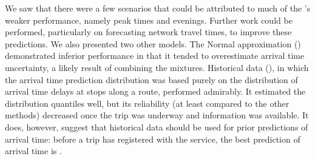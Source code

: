 We saw that there were a few scenarios that could be attributed to much of the \pf{}'s weaker performance, namely peak times and evenings. Further work could be performed, particularly on forecasting network travel times, to improve these predictions. We also presented two other models. The Normal approximation (\Fnorm{}) demonstrated inferior performance in that it tended to overestimate arrival time uncertainty, a likely result of combining the mixtures. Historical data (\Fhist{}), in which the arrival time prediction distribution was based purely on the distribution of arrival time delays at stops along a route, performed admirably. It estimated the distribution quantiles well, but its reliability (at least compared to the other methods) decreased once the trip was underway and \rt{} information was available. It does, however, suggest that historical data should be used for prior predictions of arrival time: before a trip has registered with the \rt{} service, the best prediction of arrival time is \Fhist{}.
